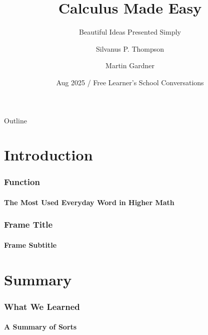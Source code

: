 \documentclass{beamer}
\title[Calculus Made Easy] %
{Calculus Made Easy}
\subtitle
{Beautiful Ideas Presented Simply} %
\author[SPT, MG, KM] %
{Silvanus P. Thompson\inst{1} \and Martin Gardner\inst{2}}
\institute[Royal Society] %
{
  \inst{1}%
  Original Author
  \and
  \inst{2}%
  Annotator
  }
\date[August 2025] %
{Aug 2025 / Free Learner's School Conversations}
\begin{document}
\begin{frame}
  \titlepage
\end{frame}

\begin{frame}{Outline}
  \tableofcontents
\end{frame}




\section{Introduction}
\begin{frame}
\frametitle{Function}
\framesubtitle{The Most Used Everyday Word in Higher Math}
\label{slide:function1}
\end{frame}
\begin{frame}
\frametitle{Frame Title}
\framesubtitle{Frame Subtitle}
\label{slide:slidelabel}
\end{frame}
\section{Summary}
\begin{frame}
\frametitle{What We Learned}
\framesubtitle{A Summary of Sorts}
\label{slide:summary}
\end{frame}
\end{document}
